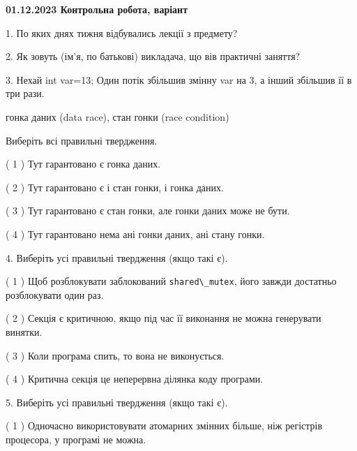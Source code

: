 \documentclass[12pt, ukrainian]{article}
\def\code#1{\Verb!#1!}
\begin{document}
\vspace{4mm}
\newpage
\begin {large}

\textbf{01.12.2023 Контрольна робота, варіант  }\par


{
1. По яких днях тижня відбувались лекції з предмету?



\vspace{5mm}
2. Як зовуть (ім'я, по батькові) викладача, що вів практичні заняття?



\vspace{5mm}
3. Нехай int var=13; Один потік збільшив змінну var на 3, а інший збільшив її в три рази.

гонка даних (data race), стан гонки (race condition)

Виберіть всі правильні твердження.\par
\vspace{2mm}
( 1 ) Тут гарантовано є гонка даних.%

( 2 ) Тут гарантовано є і стан гонки, і гонка даних.%

( 3 ) Тут гарантовано є стан гонки, але гонки даних може не бути.%

( 4 ) Тут гарантовано нема ані гонки даних, ані стану гонки.%


\vspace{5mm}
4. Виберіть усі правильні твердження (якщо такі є).\par
\vspace{2mm}

( 1 ) Щоб розблокувати заблокований \code{shared\_mutex}, його завжди достатньо розблокувати один раз.%

( 2 ) Секція є критичною, якщо під час її виконання не можна генерувати винятки.%

( 3 ) Коли програма спить, то вона не виконується.%

( 4 ) Критична секція це неперервна ділянка коду програми.%


\vspace{5mm}
5. Виберіть усі правильні твердження (якщо такі є).\par
\vspace{2mm}

( 1 ) Одночасно використовувати атомарних змінних більше, ніж регістрів процесора, у програмі не можна.%

}
\end{large}
\end{document}
